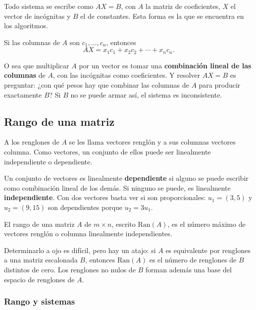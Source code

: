 \documentclass[11pt,letterpaper]{article}
\begin{document}
Todo sistema se escribe como $AX = B$, con $A$ la matriz de
coeficientes, $X$ el vector de incógnitas y $B$ el de constantes. Esta
forma es la que se encuentra en los algoritmos.

Si las columnas de $A$ son $c_1, \ldots, c_n$, entonces
\[
    AX = x_1 c_1 + x_2 c_2 + \cdots + x_n c_n .
\]

\begin{idea}
  O sea que multiplicar $A$ por un vector es tomar una
  \textbf{combinación lineal de las columnas} de $A$, con las
  incógnitas como coeficientes. Y resolver $AX = B$ es preguntar: ¿con
  qué pesos hay que combinar las columnas de $A$ para producir
  exactamente $B$? Si $B$ no se puede armar así, el sistema es
  inconsistente.
\end{idea}


\subsection*{Rango de una matriz}

A los renglones de $A$ se les llama vectores renglón y a sus columnas
vectores columna. Como vectores, un conjunto de ellos puede ser
linealmente independiente o dependiente.

\begin{definicion}
  Un conjunto de vectores es linealmente \textbf{dependiente} si
  alguno se puede escribir como combinación lineal de los demás. Si
  ninguno se puede, es linealmente \textbf{independiente}. Con dos
  vectores basta ver si son proporcionales: $u_1 = (3,5)$ y
  $u_2 = (9,15)$ son dependientes porque $u_2 = 3u_1$.
\end{definicion}

\begin{definicion}[Rango]
  El rango de una matriz $A$ de $m \times n$, escrito
  $\mathrm{Ran}(A)$, es el número máximo de vectores renglón o columna
  linealmente independientes.
\end{definicion}

Determinarlo a ojo es difícil, pero hay un atajo: si $A$ es
equivalente por renglones a una matriz escalonada $B$, entonces
$\mathrm{Ran}(A)$ es el número de renglones de $B$ distintos de cero.
Los renglones no nulos de $B$ forman además una base del espacio de
renglones de $A$.

\subsubsection*{Rango y sistemas}
\end{document}
